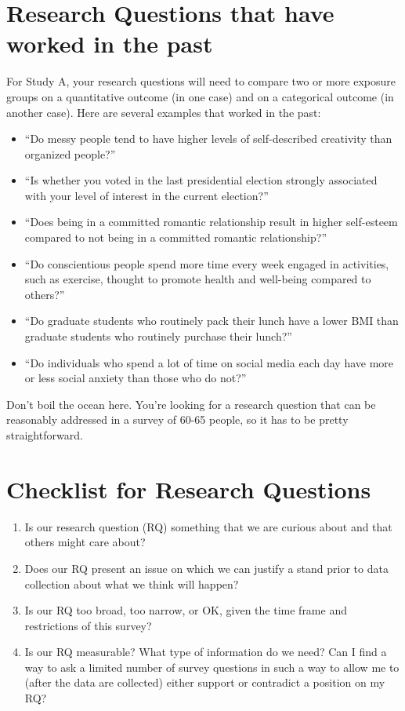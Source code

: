 \documentclass[]{book}
\providecommand{\tightlist}{%
  \setlength{\itemsep}{0pt}\setlength{\parskip}{0pt}}
\begin{document}
\hypertarget{research-questions-that-have-worked-in-the-past}{%
\section{Research Questions that have worked in the past}\label{research-questions-that-have-worked-in-the-past}}

For Study A, your research questions will need to compare two or more exposure groups on a quantitative outcome (in one case) and on a categorical outcome (in another case). Here are several examples that worked in the past:

\begin{itemize}
\tightlist
\item
  ``Do messy people tend to have higher levels of self-described creativity than organized people?''
\item
  ``Is whether you voted in the last presidential election strongly associated with your level of interest in the current election?''
\item
  ``Does being in a committed romantic relationship result in higher self-esteem compared to not being in a committed romantic relationship?''
\item
  ``Do conscientious people spend more time every week engaged in activities, such as exercise, thought to promote health and well-being compared to others?''
\item
  ``Do graduate students who routinely pack their lunch have a lower BMI than graduate students who routinely purchase their lunch?''
\item
  ``Do individuals who spend a lot of time on social media each day have more or less social anxiety than those who do not?''
\end{itemize}

Don't boil the ocean here. You're looking for a research question that can be reasonably addressed in a survey of 60-65 people, so it has to be pretty straightforward.

\hypertarget{checklist-for-research-questions}{%
\section{Checklist for Research Questions}\label{checklist-for-research-questions}}

\begin{enumerate}
\def\labelenumi{\arabic{enumi}.}
\tightlist
\item
  Is our research question (RQ) something that we are curious about and that others might care about?
\item
  Does our RQ present an issue on which we can justify a stand prior to data collection about what we think will happen?
\item
  Is our RQ too broad, too narrow, or OK, given the time frame and restrictions of this survey?
\item
  Is our RQ measurable? What type of information do we need? Can I find a way to ask a limited number of survey questions in such a way to allow me to (after the data are collected) either support or contradict a position on my RQ?
\end{enumerate}
\end{document}
